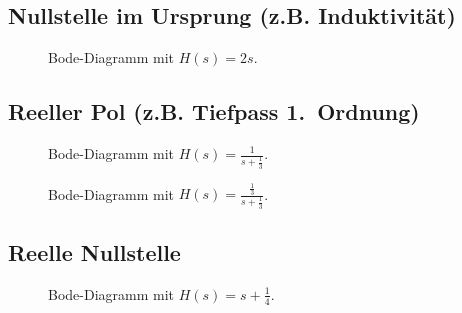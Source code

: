 {\subsection{Nullstelle im Ursprung (z.B. Induktivit\"at)}
\vspace*{-5mm}
\begin{figure}[!htb]%
\vspace*{-8mm}
\begin{center}
  \vspace*{-3mm}\caption{Bode-Diagramm mit $H(s)=2 s$.}
\end{center}
\vspace*{-6mm}
\end{figure}

\newpage
\vspace*{-5mm}\subsection{Reeller Pol (z.B. Tiefpass 1.~Ordnung)}
\vspace*{-5mm}
\begin{figure}[!htb]%
\vspace*{-5mm}
\begin{center}
  \vspace*{-3mm}\caption{Bode-Diagramm mit $H(s)=\frac{1}{s+\frac{1}{3}}$.}
\end{center}
\vspace*{-6mm}
\end{figure}

\begin{figure}[!htb]%
\vspace*{-5mm}
\begin{center}
  \vspace*{-3mm}\caption{Bode-Diagramm mit $H(s)=\frac{\frac{1}{3}}{s+ \frac{1}{3} }$.}
\end{center}
\vspace*{-6mm}
\end{figure}

\newpage
\vspace*{-5mm}\subsection{Reelle Nullstelle} 
\vspace*{-5mm}
\begin{figure}[!htb]%
\vspace*{-5mm}
\begin{center}
  \vspace*{-3mm}\caption{Bode-Diagramm mit $H(s)=s+\frac{1}{4}$.}
\end{center}
\vspace*{-6mm}
\end{figure}

}
